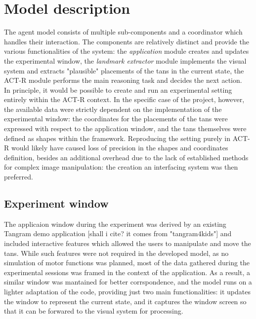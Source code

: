 \documentclass[a4paper,singleside,12pt]{report} %
\begin{document}
	\chapter{Model description}
    
	The agent model consists of multiple sub-components and a coordinator which handles their
	interaction. The components are relatively distinct and provide the various functionalities of
	the system: the \textit{application} module creates and updates the experimental window, the
	\textit{landmark extractor} module implements the visual system and extracts "plausible" placements
	of the tans in the current state, the ACT-R module performs the main reasoning task and decides
	the next action.\\
    In principle, it would be possible to create and run an experimental setting entirely within the ACT-R
	context. In the specific case of the project, however, the available data were strictly
	dependent on the implementation of the experimental window: the coordinates for the placements
	of the tans were expressed with respect to the application window, and the tans themselves were
	defined as shapes within the framework. Reproducing the setting purely in ACT-R would likely
	have caused loss of precision in the shapes and coordinates definition, besides an additional
	overhead due to the lack of established methods for complex image manipulation: the creation an
	interfacing system was then preferred.\\
    
    \section{Experiment window}
	The applicaion window during the experiment was derived by an existing Tangram demo application
	[shall i cite? it comes from "tangram4kids"] and included interactive features which allowed the
	users to manipulate and move the tans. While such features were not required in the developed
	model, as no simulation of motor functions was planned, most of the data gathered during the
	experimental sessions was framed in the context of the application. As a result, a similar
	window was mantained for better corrspondence, and the model runs on a lighter adaptation of the
	code, providing just two main functionalities: it updates the window to represent the current state, and it
	captures the window screen so that it can be forwared to the visual system for processing.
\end{document}
